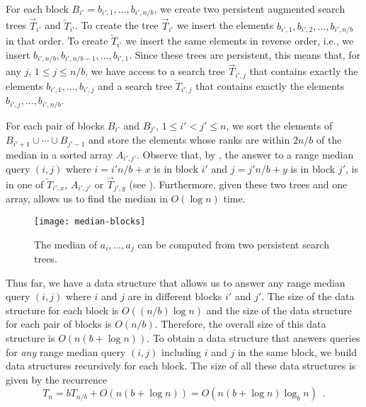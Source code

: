 \documentclass{njcarticle}
\begin{document}
For each block $B_{i'}=b_{i',1},\ldots,b_{i',n/b}$, we create two
persistent augmented search trees $\overrightarrow{T}_{i'}$ and
$\overleftarrow{T}_{i'}$.  To create the tree $\overrightarrow{T}_{i'}$ we
insert the elements $b_{i',1},b_{i',2},\ldots,b_{i',n/b}$ in that
order.  To create $\overleftarrow{T}_{i'}$ we insert the same elements
in reverse order, i.e., we insert
$b_{i',n/b},b_{i',n/b-1},\ldots,b_{i',1}$.   Since these trees are
persistent, this means that, for any $j$, $1\le j\le n/b$, we have
access to a search tree $\overrightarrow{T}_{i',j}$ that contains
exactly the elements $b_{i',1},\ldots,b_{i',j}$ and a search tree
$\overleftarrow{T}_{i',j}$ that contains exactly the elements
$b_{i',j},\ldots,b_{i',n/b}$.

For each pair of blocks $B_{i'}$ and $B_{j'}$, $1\le i'<j'\le n$, we
sort the elements of $B_{i'+1}\cup\cdots\cup B_{j'-1}$ and store the
elements whose ranks are within $2n/b$ of the median in a sorted array
$A_{i',j'}$.  Observe that, by , the answer to
a range median query $(i,j)$ where $i=i'n/b+x$ is in block $i'$ and
$j=j'n/b+y$ is in block $j'$, is in one of $\overleftarrow{T}_{i',x}$,
$A_{i',j'}$ or $\overrightarrow{T}_{j',y}$ (see
).  Furthermore, given these two trees and one
array,  allows us to find the median in
$O(\log n)$ time. 

\begin{figure}
\begin{center}\texttt{[image: median-blocks]}\end{center}
\caption{The median of $a_i,\ldots,a_j$ can be computed 
from two persistent search trees.} 
\end{figure}

Thus far, we have a data structure that allows us to answer any range
median query $(i,j)$ where $i$ and $j$ are in different blocks $i'$
and $j'$.  The size of the data structure for each block is
$O((n/b)\log n)$ and the size of the data structure for each pair of
blocks is $O(n/b)$.  Therefore, the overall size of this data
structure is $O(n(b+\log n))$.  To obtain a data structure that
answers queries for \emph{any} range median query $(i,j)$ including
$i$ and $j$ in the same block, we build data structures recursively
for each block.  The size of all these data structures is given by the
recurrence 
\[ T_n = bT_{n/b} + O(n(b+\log n)) = O(n(b+\log n)\log_b n) \enspace .
\]
\end{document}
